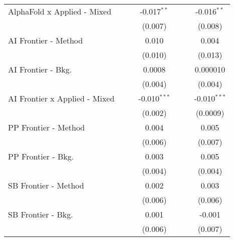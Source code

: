 \begin{tabular}{lcccccc}
   AlphaFold x Applied - Mixed   &               &              & -0.017$^{**}$  &               &              & -0.016$^{**}$\\   
                                 &               &              & (0.007)        &               &              & (0.008)\\   
   AI Frontier - Method          &               &              & 0.010          &               &              & 0.004\\   
                                 &               &              & (0.010)        &               &              & (0.013)\\   
   AI Frontier - Bkg.            &               &              & 0.0008         &               &              & 0.000010\\   
                                 &               &              & (0.004)        &               &              & (0.004)\\   
   AI Frontier x Applied - Mixed &               &              & -0.010$^{***}$ &               &              & -0.010$^{***}$\\   
                                 &               &              & (0.002)        &               &              & (0.0009)\\   
   PP Frontier - Method          &               &              & 0.004          &               &              & 0.005\\   
                                 &               &              & (0.006)        &               &              & (0.007)\\   
   PP Frontier - Bkg.            &               &              & 0.003          &               &              & 0.005\\   
                                 &               &              & (0.004)        &               &              & (0.004)\\   
   SB Frontier - Method          &               &              & 0.002          &               &              & 0.003\\   
                                 &               &              & (0.006)        &               &              & (0.006)\\   
   SB Frontier - Bkg.            &               &              & 0.001          &               &              & -0.001\\   
                                 &               &              & (0.006)        &               &              & (0.007)\\   

\end{tabular}
